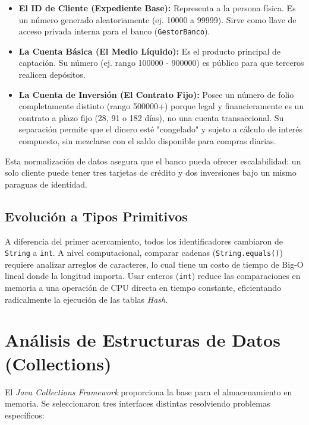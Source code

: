 \documentclass[12pt, letterpaper]{article}
\begin{document}
	\begin{itemize}
		\item \textbf{El ID de Cliente (Expediente Base):} Representa a la persona física. Es un número generado aleatoriamente (ej. 10000 a 99999). Sirve como llave de acceso privada interna para el banco (\texttt{GestorBanco}).
		\item \textbf{La Cuenta Básica (El Medio Líquido):} Es el producto principal de captación. Su número (ej. rango 100000 - 900000) es público para que terceros realicen depósitos.
		\item \textbf{La Cuenta de Inversión (El Contrato Fijo):} Posee un número de folio completamente distinto (rango 500000+) porque legal y financieramente es un contrato a plazo fijo (28, 91 o 182 días), no una cuenta transaccional. Su separación permite que el dinero esté "congelado" y sujeto a cálculo de interés compuesto, sin mezclarse con el saldo disponible para compras diarias.
	\end{itemize}
	Esta normalización de datos asegura que el banco pueda ofrecer escalabilidad: un solo cliente puede tener tres tarjetas de crédito y dos inversiones bajo un mismo paraguas de identidad.
	
	\subsection{Evolución a Tipos Primitivos}
	A diferencia del primer acercamiento, todos los identificadores cambiaron de \texttt{String} a \texttt{int}. A nivel computacional, comparar cadenas (\texttt{String.equals()}) requiere analizar arreglos de caracteres, lo cual tiene un costo de tiempo de Big-O lineal donde la longitud importa. Usar enteros (\texttt{int}) reduce las comparaciones en memoria a una operación de CPU directa en tiempo constante, eficientando radicalmente la ejecución de las tablas \textit{Hash}.
	
	\section{Análisis de Estructuras de Datos (Collections)}
	El \textit{Java Collections Framework} proporciona la base para el almacenamiento en memoria. Se seleccionaron tres interfaces distintas resolviendo problemas específicos:
	
\end{document}
